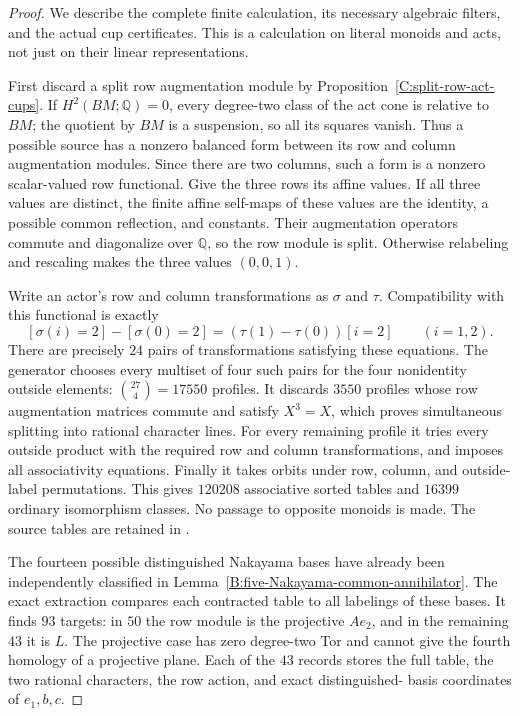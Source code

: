 \begin{proof}
We describe the complete finite calculation, its necessary algebraic
filters, and the actual cup certificates.  This is a calculation on
literal monoids and acts, not just on their linear representations.

First discard a split row augmentation module by
Proposition~\ref{C:split-row-act-cups}.  If $H^2(BM;\mathbb Q)=0$,
every degree-two class of the act cone is relative to $BM$; the
quotient by $BM$ is a suspension, so all its squares vanish.
Thus a possible source has a nonzero balanced form between its
row and column augmentation modules.  Since there are two columns,
such a form is a nonzero scalar-valued row functional.  Give the
three rows its affine values.  If all three values are distinct,
the finite affine self-maps of these values are the identity,
a possible common reflection, and constants.  Their augmentation
operators commute and diagonalize over $\mathbb Q$, so the row
module is split.  Otherwise relabeling and rescaling makes the
three values $(0,0,1)$.

Write an actor's row and column transformations as $\sigma$ and
$\tau$.  Compatibility with this functional is exactly
\[
 [\sigma(i)=2]-[\sigma(0)=2]
   =(\tau(1)-\tau(0))[i=2]\qquad(i=1,2).
\]
There are precisely $24$ pairs of transformations satisfying these
equations.  The generator
 chooses every
multiset of four such pairs for the four nonidentity outside
elements: $\binom{27}{4}=17550$ profiles.  It discards $3550$
profiles whose row augmentation matrices commute and satisfy
$X^3=X$, which proves simultaneous splitting into rational
character lines.  For every remaining profile it tries every
outside product with the required row and column transformations,
and imposes all associativity equations.  Finally it takes orbits
under row, column, and outside-label permutations.  This gives
$120208$ associative sorted tables and $16399$ ordinary
isomorphism classes.  No passage to opposite monoids is made.
The source tables are retained in
.

The fourteen possible distinguished Nakayama bases have already
been independently classified in
Lemma~\ref{B:five-Nakayama-common-annihilator}.
The exact extraction
 compares each contracted
table to all labelings of these bases.  It finds $93$ targets:
in $50$ the row module is the projective $Ae_2$, and in the
remaining $43$ it is $L$.  The projective case has zero
degree-two Tor and cannot give the fourth homology of a projective
plane.  Each of the $43$ records stores the full table, the
two rational characters, the row action, and exact distinguished-
basis coordinates of $e_1,b,c$.


\end{proof}
